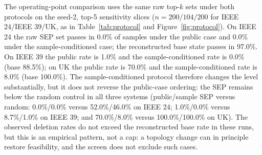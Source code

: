 The operating-point comparison uses the same raw top-$k$ sets under both protocols on the seed-2, top-5 sensitivity slices ($n=200/104/200$ for IEEE 24/IEEE 39/UK, as in Table~\ref{tab:protocol} and Figure~\ref{fig:protocol}). On IEEE 24 the raw SEP set passes in 0.0\% of samples under the public case and 0.0\% under the sample-conditioned case; the reconstructed base state passes in 97.0\%. On IEEE 39 the public rate is 1.0\% and the sample-conditioned rate is 0.0\% (base 88.5\%); on UK the public rate is 70.0\% and the sample-conditioned rate is 8.0\% (base 100.0\%). The sample-conditioned protocol therefore changes the level substantially, but it does not reverse the public-case ordering: the SEP remains below the random control in all three systems (public/sample SEP versus random: 0.0\%/0.0\% versus 52.0\%/46.0\% on IEEE 24; 1.0\%/0.0\% versus 8.7\%/1.0\% on IEEE 39; and 70.0\%/8.0\% versus 100.0\%/100.0\% on UK). The observed deletion rates do not exceed the reconstructed base rate in these runs, but this is an empirical pattern, not a cap: a topology change can in principle restore feasibility, and the screen does not exclude such cases.

